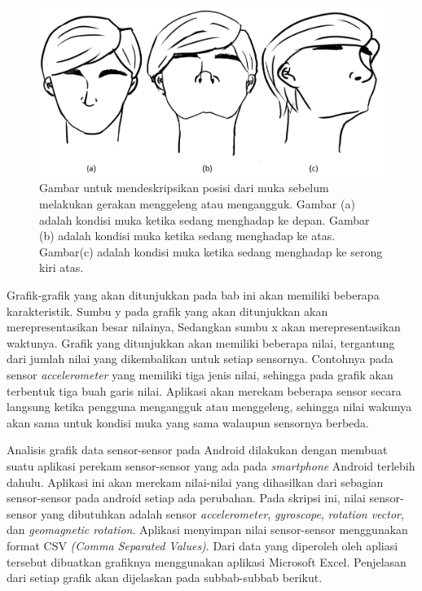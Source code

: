 \begin{figure}[htbp]
\centering
\includegraphics[scale=0.4]{Gambar/posisi-muka.png}
\caption{Gambar untuk mendeskripsikan posisi dari muka sebelum melakukan gerakan menggeleng atau mengangguk. Gambar (a) adalah kondisi muka ketika sedang menghadap ke depan. Gambar (b) adalah kondisi muka ketika sedang menghadap ke atas. Gambar(c) adalah kondisi muka ketika sedang menghadap ke serong kiri atas.}
\label{fig:posisi-muka}
\end{figure}

Grafik-grafik yang akan ditunjukkan pada bab ini akan memiliki beberapa karakteristik. Sumbu y pada grafik yang akan ditunjukkan akan merepresentasikan besar nilainya, Sedangkan sumbu x akan merepresentasikan waktunya. Grafik yang ditunjukkan akan memiliki beberapa nilai, tergantung dari jumlah nilai yang dikembalikan untuk setiap sensornya. Contohnya pada sensor \textit{accelerometer} yang memiliki tiga jenis nilai, sehingga pada grafik akan terbentuk tiga buah garis nilai. Aplikasi akan merekam beberapa sensor secara langsung ketika pengguna mengangguk atau menggeleng, sehingga nilai wakunya akan sama untuk kondisi muka yang sama walaupun sensornya berbeda.

Analisis grafik data sensor-sensor pada Android dilakukan dengan membuat suatu aplikasi perekam sensor-sensor yang ada pada \textit{smartphone} Android terlebih dahulu. Aplikasi ini akan merekam nilai-nilai yang dihasilkan dari sebagian sensor-sensor pada android setiap ada perubahan. Pada skripsi ini, nilai sensor-sensor yang dibutuhkan adalah sensor \textit{accelerometer}, \textit{gyroscope}, \textit{rotation vector}, dan \textit{geomagnetic rotation}. Aplikasi menyimpan nilai sensor-sensor menggunakan format CSV \textit{(Comma Separated Values)}. Dari data yang diperoleh oleh apliasi tersebut dibuatkan grafiknya menggunakan aplikasi Microsoft Excel. Penjelasan dari setiap grafik akan dijelaskan pada subbab-subbab berikut.
